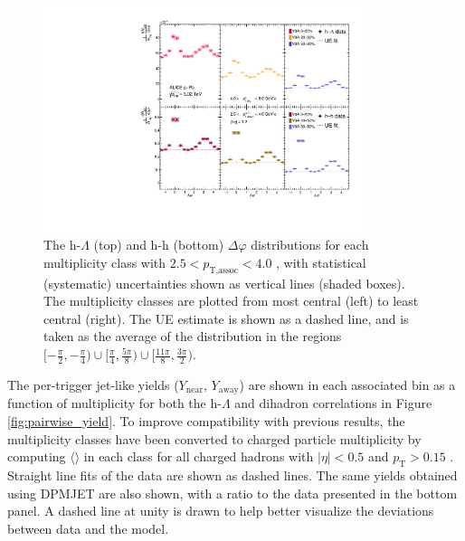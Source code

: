 \begin{figure}[h!]
\centering
\includegraphics[width=0.83\textwidth]{figures/results/dphi_final_highpt.pdf}
\caption{The h-$\Lambda$ (top) and h-h (bottom) $\Delta\varphi$ distributions for each multiplicity class with $2.5 < p_{\text{T,assoc}} < 4.0$ \GeVc, with statistical (systematic) uncertainties shown as vertical lines (shaded boxes). The multiplicity classes are plotted from most central (left) to least central (right). The UE estimate is shown as a dashed line, and is taken as the average of the distribution in the regions $[-\frac{\pi}{2}, -\frac{\pi}{4}) \cup [\frac{\pi}{4}, \frac{5\pi}{8}) \cup [\frac{11\pi}{8}, \frac{3\pi}{2})$.}
\label{fig:dphi_final_highpt}
\end{figure}

The per-trigger jet-like yields ($Y_{\text{near}}$, $Y_{\text{away}}$) are shown in each associated \pt bin as a function of multiplicity for both the h-$\Lambda$ and dihadron correlations in Figure \ref{fig:pairwise_yield}. To improve compatibility with previous results, the multiplicity classes have been converted to charged particle multiplicity by computing $\langle$\dndeta$\rangle$ in each class for all charged hadrons with $|\eta| < 0.5$ and $p_{\text{T}} > 0.15$ \GeVc. Straight line fits of the data are shown as dashed lines. The same yields obtained using DPMJET are also shown, with a ratio to the data presented in the bottom panel. A dashed line at unity is drawn to help better visualize the deviations between data and the model.

